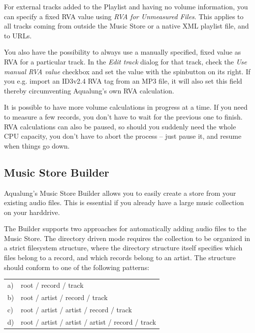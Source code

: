 \documentclass[10pt,english]{article}
\begin{document}
For external tracks added to the Playlist and having no
volume information, you can specify a fixed RVA value using
\textsl{RVA for Unmeasured Files}. This applies to all
tracks coming from outside the Music Store or a native XML
playlist file, and to URLs.




You also have the possibility to always use a manually
specified, fixed value as RVA for a particular track. In the
\textsl{Edit track} dialog for that track, check the
\textsl{Use manual RVA value} checkbox and set the value
with the spinbutton on its right. If you e.g. import an
ID3v2.4 RVA tag from an MP3 file, it will also set this field
thereby circumventing Aqualung's own RVA calculation.




It is possible to have more volume calculations in progress
at a time. If you need to measure a few records, you don't
have to wait for the previous one to finish. RVA calculations
can also be paused, so should you suddenly need the whole CPU
capacity, you don't have to abort the process -- just
pause it, and resume when things go down.




\subsection{Music Store Builder\label{idp663728}}



\noindent Aqualung's Music Store Builder allows you to easily create
a store from your existing audio files. This is essential if
you already have a large music collection on your
harddrive.




The Builder supports two approaches for automatically
adding audio files to the Music Store. The directory driven
mode requires the collection to be organized in a strict
filesystem structure, where the directory structure itself
specifies which files belong to a record, and which records
belong to an artist. The structure should conform to one of
the following patterns:


\begin{center}\begin{tabular}{ll}

a)&
root / record / track
\\

b)&
root / artist / record / track
\\

c)&
root / artist / artist / record / track
\\

d)&
root / artist / artist / artist / record / track
\\
\end{tabular}\end{center}
\end{document}
